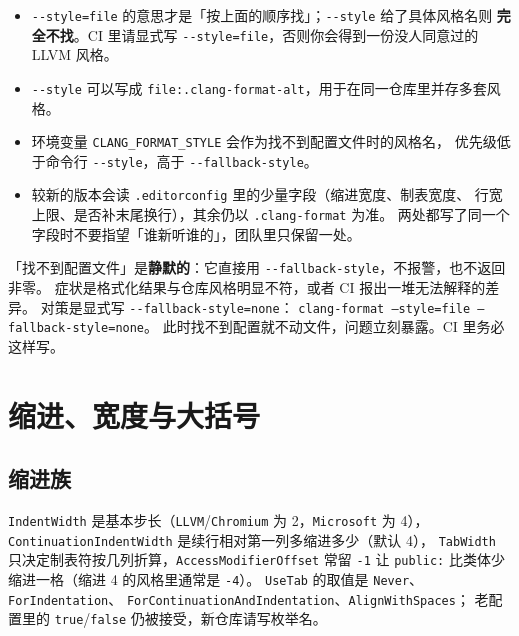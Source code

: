 \documentclass[12pt,a4paper,fontset=fandol]{ctexbook}
\newcommand{\Opt}[1]{\texttt{-\/-#1}}
\newcommand{\Bk}{\discretionary{}{}{}}
\begin{document}
\begin{itemize}
  \item \Opt{style=file} 的意思才是「按上面的顺序找」；\Opt{style} 给了具体风格名则
    \textbf{完全不找}。CI 里请显式写 \Opt{style=file}，否则你会得到一份没人同意过的
    LLVM 风格。
  \item \Opt{style} 可以写成 \texttt{file:.clang-format-alt}，用于在同一仓库里并存多套风格。
  \item 环境变量 \texttt{CLANG\_FORMAT\_STYLE} 会作为找不到配置文件时的风格名，
    优先级低于命令行 \Opt{style}，高于 \Opt{fallback-style}。
  \item 较新的版本会读 \texttt{.editorconfig} 里的少量字段（缩进宽度、制表宽度、
    行宽上限、是否补末尾换行），其余仍以 \texttt{.clang-format} 为准。
    两处都写了同一个字段时不要指望「谁新听谁的」，团队里只保留一处。
\end{itemize}

\begin{note}[title={\Opt{style=file} 与 \Opt{fallback-style} 的优先级}]
  「找不到配置文件」是\textbf{静默的}：它直接用 \Opt{fallback-style}，不报警，也不返回非零。
  症状是格式化结果与仓库风格明显不符，或者 CI 报出一堆无法解释的差异。
  对策是显式写 \Opt{fallback-style=none}：
  \texttt{clang-format --style=file --fallback-style=none}。
  此时找不到配置就不动文件，问题立刻暴露。CI 里务必这样写。
\end{note}

\section{缩进、宽度与大括号}\label{sec:ch09-s3}

\subsection{缩进族}\label{sec:ch09-s3-indent}

\texttt{IndentWidth} 是基本步长（\texttt{LLVM}/{\Bk}\texttt{Chromium} 为 2，\texttt{Microsoft}
为 4），\texttt{Continuation{\Bk}Indent{\Bk}Width} 是续行相对第一列多缩进多少（默认 4），
\texttt{TabWidth} 只决定制表符按几列折算，\texttt{Access{\Bk}Modifier{\Bk}Offset} 常留 \texttt{-1}
让 \texttt{public:} 比类体少缩进一格（缩进 4 的风格里通常是 \texttt{-4}）。
\texttt{UseTab} 的取值是 \texttt{Never}、\texttt{For{\Bk}Indentation}、
\texttt{For{\Bk}Continuation{\Bk}And{\Bk}Indentation}、\texttt{Align{\Bk}With{\Bk}Spaces}；
老配置里的 \texttt{true}/{\Bk}\texttt{false} 仍被接受，新仓库请写枚举名。
\end{document}
